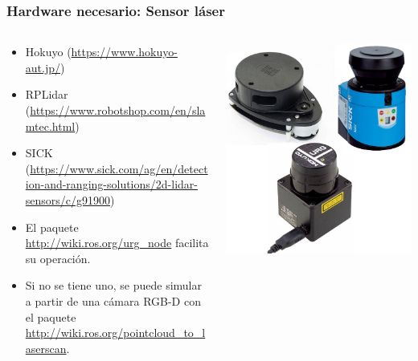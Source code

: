 \begin{frame}\frametitle{Hardware necesario: Sensor láser}
  \begin{columns}
    \begin{column}{0.5\textwidth}
      \begin{itemize}
      \item Hokuyo (\url{https://www.hokuyo-aut.jp/})
      \item RPLidar (\url{https://www.robotshop.com/en/slamtec.html})
      \item SICK (\url{https://www.sick.com/ag/en/detection-and-ranging-solutions/2d-lidar-sensors/c/g91900})
      \item El paquete \url{http://wiki.ros.org/urg_node} facilita su operación.
      \item Si no se tiene uno, se puede simular a partir de una cámara RGB-D con el paquete \url{http://wiki.ros.org/pointcloud_to_laserscan}.
      \end{itemize}
    \end{column}
    \begin{column}{0.4\textwidth}
      \includegraphics[width=\textwidth]{Figures/lasers.jpg}
    \end{column}
  \end{columns}
\end{frame}

